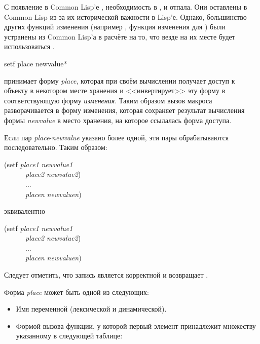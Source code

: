 С появление в Common Lisp'е , необходимость в , 
и  отпала. Они оставлены в Common Lisp из-за их исторической важности в
Lisp'е.
Однако, большинство других функций изменения (например , функция
изменения для ) были устранены из Common Lisp'а в расчёте на то, что
везде на их месте будет использоваться .

\begin{defmac}
setf {place newvalue}*

 принимает форму \emph{place}, которая
при своём вычислении получает доступ к объекту в некотором месте хранения и
<<инвертирует>> эту форму в соответствующую форму \emph{изменения}.
Таким образом вызов макроса  разворачивается в форму изменения,
которая сохраняет результат вычисления формы \emph{newvalue} в место хранения,
на которое ссылалась форма доступа.

Если пар \emph{place}-\emph{newvalue} указано более одной, эти пары
обрабатываются последовательно. Таким образом:
\begin{lisp}
(setf \emph{place1} \emph{newvalue1} \\
~~~~~~\emph{place2} \emph{newvalue2}) \\
~~~~~~... \\
~~~~~~\emph{placen} \emph{newvaluen})
\end{lisp}
эквивалентно
\begin{lisp}
(setf \emph{place1} \emph{newvalue1} \\
~~~~~~\emph{place2} \emph{newvalue2}) \\
~~~~~~... \\
~~~~~~\emph{placen} \emph{newvaluen})
\end{lisp}
Следует отметить, что запись  является корректной и возвращает {\nil}.

Форма \emph{place} может быть одной из следующих:
\begin{itemize}

\item
Имя переменной (лексической и динамической).

\item
Формой вызова функции, у которой первый элемент принадлежит множеству указанному
в следующей таблице:


\end{itemize}
\end{defmac}
